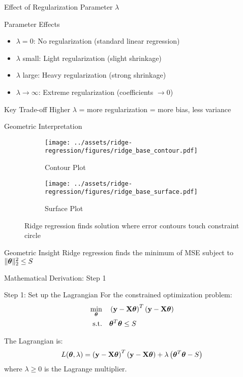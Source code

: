 \documentclass{beamer}
\begin{document}
\begin{frame}{Effect of Regularization Parameter $\lambda$}
\begin{keypointsbox}{Parameter Effects}
\begin{itemize}
\item $\lambda = 0$: No regularization (standard linear regression)
\item $\lambda$ small: Light regularization (slight shrinkage)
\item $\lambda$ large: Heavy regularization (strong shrinkage)
\item $\lambda \to \infty$: Extreme regularization (coefficients $\to 0$)
\end{itemize}
\end{keypointsbox}
\pause

\begin{alertbox}{Key Trade-off}
Higher $\lambda$ = more regularization = more bias, less variance
\end{alertbox}
\end{frame}\begin{frame}{Geometric Interpretation}
\begin{figure}
        \begin{subfigure}[b]{0.5\textwidth}
                \texttt{[image: ../assets/ridge-regression/figures/ridge\_base\_contour.pdf]}
                \caption{Contour Plot}
        \end{subfigure}%
        \begin{subfigure}[b]{0.5\textwidth}
                \texttt{[image: ../assets/ridge-regression/figures/ridge\_base\_surface.pdf]}
                \caption{Surface Plot}
        \end{subfigure}%
        \caption{Ridge regression finds solution where error contours touch constraint circle}
\end{figure}

\begin{keypointsbox}{Geometric Insight}
Ridge regression finds the minimum of MSE subject to $\|\boldsymbol{\theta}\|_2^2 \leq S$
\end{keypointsbox}
\end{frame}

\begin{frame}{Mathematical Derivation: Step 1}
\begin{codebox}{Step 1: Set up the Lagrangian}
For the constrained optimization problem:
\begin{align*}
\min_{\boldsymbol{\theta}} & \quad \left(\mathbf{y}-\mathbf{X}\boldsymbol{\theta}\right)^T\left(\mathbf{y}-\mathbf{X}\boldsymbol{\theta}\right) \\
\text{s.t.} & \quad \boldsymbol{\theta}^T\boldsymbol{\theta} \leq S
\end{align*}

The Lagrangian is:
$$L(\boldsymbol{\theta}, \lambda) = \left(\mathbf{y}-\mathbf{X}\boldsymbol{\theta}\right)^T\left(\mathbf{y}-\mathbf{X}\boldsymbol{\theta}\right) + \lambda\left(\boldsymbol{\theta}^T\boldsymbol{\theta} - S\right)$$
where $\lambda \geq 0$ is the Lagrange multiplier.
\end{codebox}
\end{frame}
\end{document}
